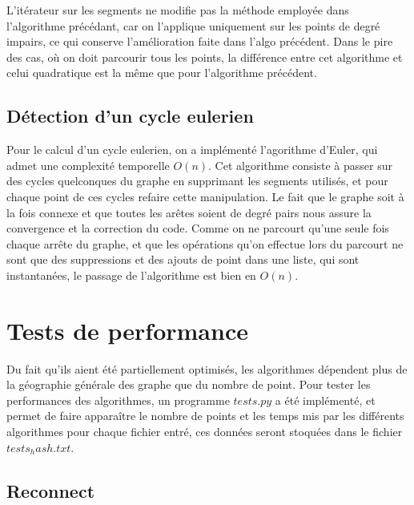 \documentclass[a4paper,11pt]{article}
\begin{document}
L'itérateur sur les segments ne modifie pas la méthode employée dans l'algorithme précédant, car on
l'applique uniquement sur les points de degré impairs, ce qui conserve l'amélioration faite dans
l'algo précédent. Dans le pire des cas, où on doit parcourir tous les points, la différence entre
cet algorithme et celui quadratique est la même que pour l'algorithme précédent.


\subsection{Détection d'un cycle eulerien}

Pour le calcul d'un cycle eulerien, on a implémenté l'agorithme d'Euler, qui admet une complexité temporelle $O(n)$. Cet algorithme consiste à passer sur des cycles quelconques du graphe en supprimant les segments
utilisés, et pour chaque point de ces cycles refaire cette manipulation. Le fait que le graphe soit à la fois connexe et que toutes
les arêtes soient de degré pairs nous assure la convergence et la correction du code. Comme on ne parcourt qu'une seule fois
chaque arrête du graphe, et que les opérations qu'on effectue lors du parcourt ne sont que des suppressions et des ajouts
de point dans une liste, qui sont instantanées, le passage de l'algorithme est bien en $O(n)$.

\section{Tests de performance}

Du fait qu'ils aient été partiellement optimisés, les algorithmes dépendent plus de la géographie générale des
graphe que du nombre de point.
Pour tester les performances des algorithmes, un programme $tests.py$ a été implémenté, et permet de faire
apparaître le nombre de points et les temps mis par les différents algorithmes pour chaque fichier entré, ces données seront
stoquées dans le fichier $tests_hash.txt$.

\subsection{Reconnect}
\end{document}
